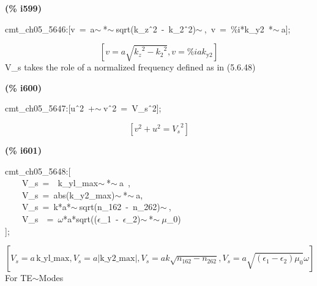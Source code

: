 \documentclass[fleqn]{article}
\begin{document}
\noindent
\begin{minipage}[t]{4.000000em}\color{red}\bfseries
(\% i599)	
\end{minipage}
\begin{minipage}[t]{\textwidth}\color{blue}
cmt\_ch05\_5646:[v\ =\ a\ensuremath{\sim\ }*\ensuremath{\sim\ }sqrt(k\_z\^\ 2\ -\ k\_2\^\ 2)\ensuremath{\sim\ },\ v\ =\ \%i*k\_y2\ *\ensuremath{\sim\ }a];
\end{minipage}
\[\displaystyle \tag{\% o599} 
\left[ v=a \sqrt{{{{k_z}}^{2}}-{{{k_2}}^{2}}}\operatorname{,}v=\% i a {k_{\ensuremath{\mathrm{y2}}}}\right] \mbox{}
\]
V\_s takes the role of a normalized frequency  defined as in (5.6.48)


\noindent
\begin{minipage}[t]{4.000000em}\color{red}\bfseries
(\% i600)	
\end{minipage}
\begin{minipage}[t]{\textwidth}\color{blue}
cmt\_ch05\_5647:[u\^\ 2\ +\ensuremath{\sim\ }v\^\ 2\ =\ V\_s\^\ 2];
\end{minipage}
\[\displaystyle \tag{\% o600} 
\left[ {{v}^{2}}+{{u}^{2}}={{{V_s}}^{2}}\right] \mbox{}
\]


\noindent
\begin{minipage}[t]{4.000000em}\color{red}\bfseries
(\% i601)	
\end{minipage}
\begin{minipage}[t]{\textwidth}\color{blue}
cmt\_ch05\_5648:[\\
\ \ \ \ V\_s\ =\ \ k\_yl\_max\ensuremath{\sim\ }*\ensuremath{\sim\ }a\ ,\\
\ \ \ \ V\_s\ =\ abs(k\_y2\_max)\ensuremath{\sim\ }*\ensuremath{\sim\ }a,\\
\ \ \ \ V\_s\ =\ k*a*\ensuremath{\sim\ }sqrt(n\_162\ -\ n\_262)\ensuremath{\sim\ },\ \\
\ \ \ \ V\_s\ \ =\ \ensuremath{\omega}*a*sqrt((\ensuremath{\epsilon}\_1\ -\ \ensuremath{\epsilon}\_2)\ensuremath{\sim\ }*\ensuremath{\sim\ }\ensuremath{\mu}\_0)\\
];
\end{minipage}
\[\displaystyle \tag{\% o601} 
\operatorname{[}{V_s}=a\, \ensuremath{\mathrm{k\_ yl\_ max}}\operatorname{,}{V_s}=a \left| \ensuremath{\mathrm{k\_ y2\_ max}}\right| \operatorname{,}{V_s}=a k \sqrt{{n_{\ensuremath{\mathrm{162}}}}-{n_{\ensuremath{\mathrm{262}}}}}\operatorname{,}{V_s}=a \sqrt{\left( {{\epsilon }_1}-{{\epsilon }_2}\right)  {{\mu }_0}} \omega \operatorname{]}\mbox{}
\]
For TE\ensuremath{\sim }Modes
\end{document}
